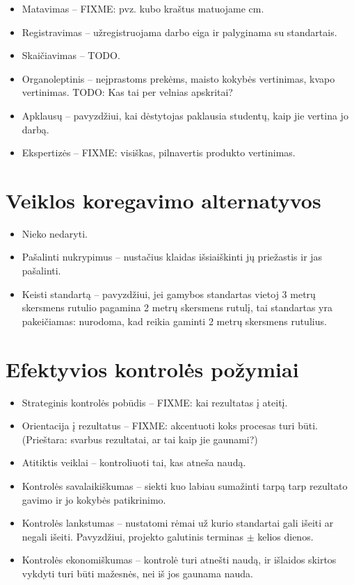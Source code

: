 \begin{itemize}
  \item Matavimas – FIXME: pvz. kubo kraštus matuojame cm.
  \item Registravimas – užregistruojama darbo eiga ir palyginama su
    standartais.
  \item Skaičiavimas – TODO.
  \item Organoleptinis – neįprastoms prekėms, maisto kokybės vertinimas,
    kvapo vertinimas. TODO: Kas tai per velnias apskritai?
  \item Apklausų – pavyzdžiui, kai dėstytojas paklausia studentų, kaip
    jie vertina jo darbą.
  \item Ekspertizės – FIXME: visiškas, pilnavertis produkto vertinimas.
\end{itemize}

\section{Veiklos koregavimo alternatyvos}

\begin{itemize}
  \item Nieko nedaryti.
  \item Pašalinti nukrypimus – nustačius klaidas išsiaiškinti jų priežastis
    ir jas pašalinti.
  \item Keisti standartą – pavyzdžiui, jei gamybos standartas vietoj
    3 metrų skersmens rutulio pagamina 2 metrų skersmens rutulį, tai
    standartas yra pakeičiamas: nurodoma, kad reikia gaminti 2 metrų
    skersmens rutulius.
\end{itemize}

\section{Efektyvios kontrolės požymiai}

\begin{itemize}
  \item Strateginis kontrolės pobūdis – FIXME: kai rezultatas į ateitį.
  \item Orientacija į rezultatus – FIXME: akcentuoti koks procesas turi
    būti. (Prieštara: svarbus rezultatai, ar tai kaip jie gaunami?)
  \item Atitiktis veiklai – kontroliuoti tai, kas atneša naudą.
  \item Kontrolės savalaikiškumas – siekti kuo labiau sumažinti tarpą
    tarp rezultato gavimo ir jo kokybės patikrinimo.
  \item Kontrolės lankstumas – nustatomi rėmai už kurio standartai
    gali išeiti ar negali išeiti. Pavyzdžiui, projekto galutinis terminas
    $\pm$ kelios dienos.
  \item Kontrolės ekonomiškumas – kontrolė turi atnešti naudą, ir išlaidos
    skirtos vykdyti turi būti mažesnės, nei iš jos gaunama nauda.
\end{itemize}
